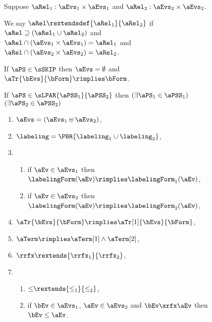 \begin{figure}
  \raggedright
  \noindent
  Suppose $\aRel_1:\aEvs_1\times\aEvs_1$ and $\aRel_2:\aEvs_2\times\aEvs_2$.

  We say $\aRel \rextendsdef{\aRel_1}{\aRel_2}$ if
  $\aRel\supseteq (\aRel_1\cup \aRel_2)$ and
  $\aRel\cap(\aEvs_1\times \aEvs_1) = \aRel_1$ and
  $\aRel\cap(\aEvs_2\times \aEvs_2) = \aRel_2$.
  \medskip
  
  \noindent
  If $\aPS\in\sSKIP$ then $\aEvs = \emptyset$ and
  $\aTr{\bEvs}{\bForm} \rimplies \bForm$.
  \medskip

  \noindent
  If $\aPS \in \sLPAR{\aPSS_1}{\aPSS_2}$ then  
  $(\exists\aPS_1\in\aPSS_1)$ $(\exists\aPS_2\in\aPSS_2)$
  \begin{multicols}{2}
    \begin{enumerate}[topsep=0pt,label=(\textsc{p}\arabic*),ref=\textsc{p}\arabic*]
    \item \label{par-E}
      $\aEvs = (\aEvs_1\uplus\aEvs_2)$,
    \item \label{par-lambda}
      ${\labeling}=\PBR{{\labeling_1}\cup {\labeling_2}}$, 
    \item[] 
      \begin{enumerate}[leftmargin=0pt]
      \item \label{par-kappa1}
        if $\aEv\in\aEvs_1$ then $\labelingForm(\aEv) \rimplies \labelingForm_1(\aEv)$,
      \item \label{par-kappa2}
        if $\aEv\in\aEvs_2$ then $\labelingForm(\aEv) \rimplies \labelingForm_2(\aEv)$,
      \end{enumerate}
    \item \label{par-tau}
      $\aTr{\bEvs}{\bForm} \rimplies \aTr[1]{\bEvs}{\bForm}$,
    \item \label{par-term}
      $\aTerm \rimplies \aTerm[1]\land\aTerm[2]$,
    \item \label{par-rf}
      ${\rrfx}\rextends{\rrfx_1}{\rrfx_2}$,
    \item[] 
      \begin{enumerate}[leftmargin=0pt]
      \item \label{par-le-extends}
        ${\le}\rextends{\le_1}{\le_2}$,
      \item \label{par-le-rf}
        if $\bEv\in\aEvs_1$, $\aEv\in\aEvs_2$ and $\bEv\xrfx\aEv$ then $\bEv\le\aEv$.
      \end{enumerate}
    \end{enumerate}
  \end{multicols}
  \medskip


\end{figure}
